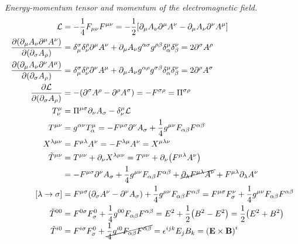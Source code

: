 \documentclass{report}
\begin{document}
\begin{subquests}
	\item \emph{Energy-momentum tensor and momentum of the electromagnetic field.}
	\begin{align*}
		{\cal L} & = -\frac{1}{4}F_{\mu\nu}F^{\mu\nu} = -\frac{1}{2}\bqty{\partial_{\mu}A_{\nu}\partial^{\mu}A^{\nu} - \partial_{\mu}A_{\nu}\partial^{\nu}A^{\mu}} \\
		\pdv{\pqty{\partial_{\mu}A_{\nu}\partial^{\mu}A^{\nu}}}{\pqty{\partial_{\sigma}A_{\rho}}} & = \delta^{\sigma}_{\mu}\delta^{\rho}_{\nu}\partial^{\mu}A^{\nu} + \partial_{\mu}A_{\nu}g^{\alpha\sigma}g^{\rho\beta}\delta^{\mu}_{\alpha}\delta^{\nu}_{\beta}= 2\partial^{\sigma}A^{\rho} \\
		\pdv{\pqty{\partial_{\mu}A_{\nu}\partial^{\nu}A^{\mu}}}{\pqty{\partial_{\sigma}A_{\rho}}} & = \delta^{\sigma}_{\mu}\delta^{\rho}_{\nu}\partial^{\nu}A^{\mu} + \partial_{\mu}A_{\nu}g^{\alpha\rho}g^{\sigma\beta}\delta^{\mu}_{\alpha}\delta^{\nu}_{\beta}= 2\partial^{\rho}A^{\sigma} \\
		\pdv{\cal L}{\pqty{\partial_{\sigma}A_{\rho}}} & = -\pqty{\partial^{\sigma}A^{\rho} - \partial^{\rho}A^{\sigma}} = - F^{\sigma\rho} = \Pi^{\sigma\rho} \\
		T^{\mu}_{\nu} & = \Pi^{\mu\sigma}\partial_{\nu}A_{\sigma} - \delta^{\mu}_{\nu}{\cal L} \\
		T^{\mu\nu} & = g^{\alpha\nu}T^{\mu}_{\alpha} = -F^{\mu\sigma}\partial^{\nu}A_{\sigma} + \frac{1}{4}g^{\mu\nu}F_{\alpha\beta}F^{\alpha\beta} \\
		X^{\lambda\mu\nu} & = F^{\mu\lambda}A^{\nu} = -F^{\lambda\mu}A^{\nu} = X^{\mu\lambda\nu} \\
		\tilde{T}^{\mu\nu} & = T^{\mu\nu} + \partial_{\nu}X^{\lambda\mu\nu} = T^{\mu\nu} + \partial_{\nu}\pqty{F^{\mu\lambda}A^{\nu}} \\
		& = -F^{\mu\sigma}\partial^{\nu}A_{\sigma} + \frac{1}{4}g^{\mu\nu}F_{\alpha\beta}F^{\alpha\beta} + \cancel{\partial_\lambda F^{\mu\lambda}A^{\nu}} + F^{\mu\lambda}\partial_{\lambda}A^{\nu} \\
		\bqty{\lambda\to\sigma} & = F^{\mu\sigma}\pqty{\partial_{\sigma}A^{\nu} - \partial^{\nu}A_{\sigma}} + \frac{1}{4}g^{\mu\nu}F_{\alpha\beta}F^{\alpha\beta} = F^{\mu\sigma}F^{\nu}_{\sigma} + \frac{1}{4}g^{\mu\nu}F_{\alpha\beta}F^{\alpha\beta} \\ 
		\tilde{T}^{00} & = F^{0\sigma}F^0_{\sigma} + \frac{1}{4}g^{00}F_{\alpha\beta}F^{\alpha\beta} = {E}^2 + \frac{1}{2}\pqty{{B}^2 - {E}^2} = \frac{1}{2}\pqty{{E}^2 + {B}^2} \\
		\tilde{T}^{i0} & = F^{i\sigma}F^0_\sigma + \cancel{\frac{1}{4}g^{i0}F_{\alpha\beta}F^{\alpha\beta}} = \epsilon^{ijk}E_j B_k = \pqty{\vb E \times \vb B}^i
	\end{align*}
\end{subquests}
\end{document}
